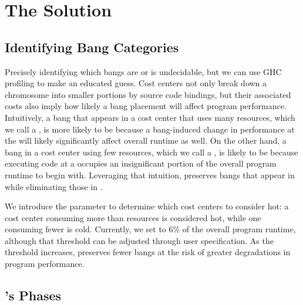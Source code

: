 
\section{The Solution}

\subsection{Identifying Bang Categories}

Precisely identifying which bangs are \useless{} or \useful{} is undecidable, but
we can use GHC profiling to make an educated guess. 
Cost centers not only break down a chromosome into
smaller portions by source code bindings, but their associated costs
also imply how likely a bang placement will affect program
performance. 
Intuitively, a bang that appears in a cost center that uses many resources, which we
call a \textit{\hotspot}, is more likely to be \useful{} because a bang-induced
change in performance at the \hotspot{} will likely significantly affect overall
runtime as well. On the other hand, a bang in a cost center using few resources, 
which we call a \textit{\coldspot}, is likely to be \useless{} because executing
code at a \coldspot{} occupies an insignificant portion of the overall program
runtime to begin with. Leveraging that intuition, \At{} preserves bangs that appear
in \hotspots{} while eliminating those in \coldspots.

We introduce the \hotspotcost{} parameter to determine
which cost centers to consider hot:  a cost center consuming more
than \hotspotcost{} resources is considered hot, while
one consuming fewer is cold.
Currently, we set \hotspotcost{}
to 6\% of the overall program runtime, although that threshold can
be adjusted through user specification. 
As the threshold increases, \At{} preserves fewer bangs
at the risk of greater degradations in program performance.

\subsection{\At{}'s Phases}

